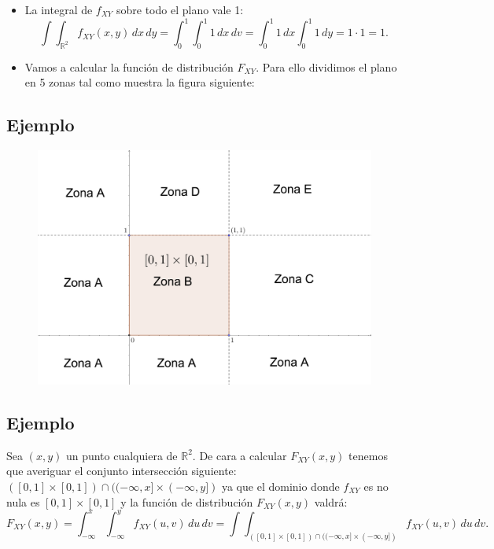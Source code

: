 \documentclass[]{book}
\begin{document}
\begin{itemize}
\item
  La integral de \(f_{XY}\) sobre todo el plano vale 1:
  \[
  \int\int_{\mathbb{R}^2} f_{XY}(x,y)\,dx\, dy=\int_0^1\int_0^1 1\, dx\, dv=\int_0^1 1\, dx\int_0^1 1\, dy=1\cdot 1=1.
  \]
\item
  Vamos a calcular la función de distribución \(F_{XY}\). Para ello dividimos el plano en 5 zonas tal como muestra la figura siguiente:
\end{itemize}

\hypertarget{ejemplo-43}{%
\subsection{Ejemplo}\label{ejemplo-43}}

\begin{figure}
\includegraphics[width=700px]{Images/VaUniformeBidi2} \end{figure}

\hypertarget{ejemplo-44}{%
\subsection{Ejemplo}\label{ejemplo-44}}

Sea \((x,y)\) un punto cualquiera de \(\mathbb{R}^2\). De cara a calcular \(F_{XY}(x,y)\) tenemos que averiguar el conjunto intersección siguiente: \(([0,1]\times [0,1])\cap ((-\infty,x]\times (-\infty,y])\) ya que el dominio donde \(f_{XY}\) es no nula es \([0,1]\times [0,1]\) y la función de distribución \(F_{XY}(x,y)\) valdrá:
\[
F_{XY}(x,y)=\int_{-\infty}^x\int_{-\infty}^y f_{XY}(u,v)\,du\,dv =\int\int_{([0,1]\times [0,1])\cap ((-\infty,x]\times (-\infty,y])} f_{XY}(u,v)\,du\,dv.
\]
\end{document}
